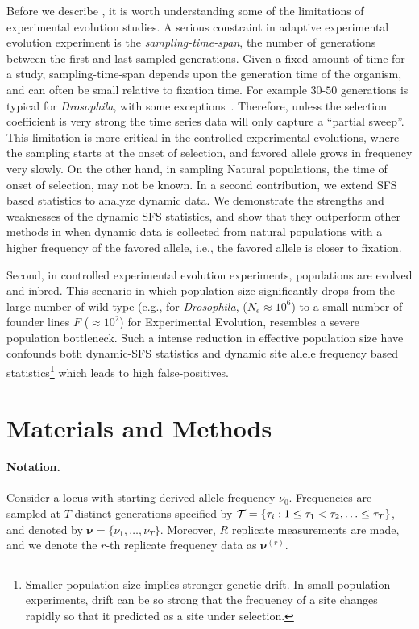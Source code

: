 \documentclass[11pt]{article}
\def\comale{\text{{\sc Comale}}}
\begin{document}
Before we describe \comale, it is worth understanding some of the
limitations of experimental evolution studies. A serious constraint in
adaptive experimental evolution experiment is the
\emph{sampling-time-span}, the number of generations between the first
and last sampled generations. Given a fixed amount of time for a
study, sampling-time-span depends upon the generation time of the
organism, and can often be small relative to fixation time. For
example $30$-$50$ generations is typical for \emph{Drosophila}, with
some exceptions~\cite{zhou2011experimental}.  Therefore, unless the
selection coefficient is very strong the time series data will only
capture a ``partial sweep''.  This limitation is more critical in the
controlled experimental evolutions, where the sampling starts at the
onset of selection, and favored allele grows in frequency very slowly.
On the other hand, in sampling Natural populations, the time of onset
of selection, may not be known. In a second contribution, we extend
SFS based statistics to analyze dynamic data. We demonstrate the
strengths and weaknesses of the dynamic SFS statistics, and show that
they outperform other methods in when dynamic data is collected from
natural populations with a higher frequency of the favored allele,
i.e., the favored allele is closer to fixation.

 Second,
in controlled experimental evolution experiments, populations are
evolved and inbred. This scenario in which population size
significantly drops from the large number of wild type (e.g., for
\emph{Drosophila}, ($N_e\approx10^6$) to a small number of founder
lines $F$ ($\approx 10^2$) for Experimental Evolution, resembles a
severe population bottleneck. Such a intense reduction in effective
population size have confounds both dynamic-SFS statistics and dynamic
site allele frequency based statistics\footnote{Smaller population
  size implies stronger genetic drift. In small population
  experiments, drift can be so strong that the frequency of a site
  changes rapidly so that it predicted as a site under selection.}
which leads to high false-positives.


\section{Materials and Methods}

\paragraph{Notation.} 
Consider a locus with starting derived allele frequency
$\nu_0$. Frequencies are sampled at $T$ distinct generations specified
by ${\cal T}= \{\tau_i: 1\le \tau_1<\tau_2,\ldots\le \tau_T\}$, and
denoted by $\bm{\nu}=\{\nu_1,\ldots,\nu_T\}$. Moreover, $R$ replicate
measurements are made, and we denote the $r$-th replicate frequency
data as $\bm{\nu}^{(r)}$.
\end{document}
